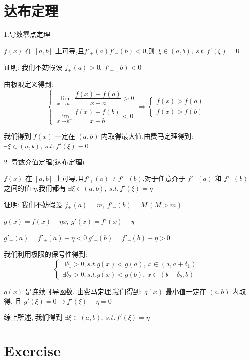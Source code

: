 \section{达布定理}
\begin{theorem}
	1.导数零点定理

	$f(x)$ 在 $[a,b]$ 上可导,且$f'_{+}(a)f'_{-}(b)<0$,则$\exists \xi\in(a,b),\ s.t.\ f'(\xi)=0$

	证明: 我们不妨假设 $f_{+}(a)>0,\ f'_{-}(b)<0$

	由极限定义得到:
	$$\left\lbrace
		\begin{array}{l}
			\lim\limits_{x\rightarrow a^{+}}\dfrac{f(x)-f(a)}{x-a}>0 \\
			\lim\limits_{x\rightarrow b^{-}}\dfrac{f(x)-f(b)}{x-b}<0
		\end{array}
		\right. \Rightarrow
		\left\lbrace
		\begin{array}{l}
			f(x)>f(a) \\
			f(x)>f(b)
		\end{array}
		\right. $$

	我们得到 $f(x)$ 一定在 $(a,b)$ 内取得最大值,由费马定理得到: $\exists \xi\in(a,b),\ s.t.\ f'(\xi)=0$

	2. 导数介值定理(达布定理)

	$f(x)$ 在 $[a,b]$ 上可导,且$f'_{+}(a)\neq f'_{-}(b)$,对于任意介于 $f'_{+}(a)$ 和 $f'_{-}(b)$ 之间的值 $\eta$,我们都有 $\exists \xi\in(a,b),\ s.t.\ f'(\xi)=\eta$

	证明: 我们不妨假设 $f_{+}(a)=m,\ f'_{-}(b)=M\ (M>m)$

	$g(x)=f(x)-\eta x,\ g'(x)=f'(x)-\eta$

	$g'_{+}(a)=f'_{+}(a)-\eta<0\ g'_{-}(b)=f'_{-}(b)-\eta>0$

	我们利用极限的保号性得到:
	$$\begin{cases}
		\exists \delta_{1}>0, s.t. g(x)<g(a),\ x\in(a,a+\delta_{1}) \\
		\exists \delta_{2}>0, s.t. g(x)<g(b),\ x\in(b-\delta_{2},b)
	\end{cases}$$

	$g(x)$ 是连续可导函数, 由费马定理,我们得到: $g(x)$ 最小值一定在 $(a,b)$ 内取得, 且 $g'(\xi)=0\to f'(\xi) -\eta =0$

	综上所述, 我们得到 $\exists \xi\in(a,b),\ s.t.\ f'(\xi)=\eta$
\end{theorem}
\section{Exercise}

